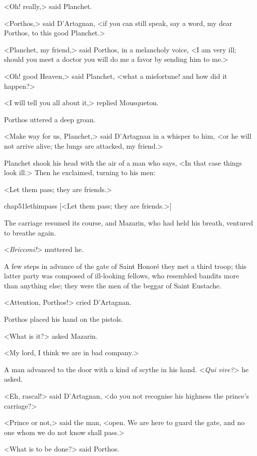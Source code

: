 <Oh! really,> said Planchet.

<Porthos,> said D'Artagnan, <if you can still speak, say a word, my dear Porthos, to this good Planchet.>

<Planchet, my friend,> said Porthos, in a melancholy voice, <I am very ill; should you meet a doctor you will do me a favor by sending him to me.>

<Oh! good Heaven,> said Planchet, <what a misfortune! and how did it happen?>

<I will tell you all about it,> replied Mousqueton.

Porthos uttered a deep groan.

<Make way for us, Planchet,> said D'Artagnan in a whisper to him, <or he will not arrive alive; the lungs are attacked, my friend.>

Planchet shook his head with the air of a man who says, <In that case things look ill.> Then he exclaimed, turning to his men:

<Let them pass; they are friends.>

\begin{bwbigpic}
	[\basicscale] 
	{chap51lethimpass}
	[<Let them pass; they are friends.>]
\end{bwbigpic}

The carriage resumed its course, and Mazarin, who had held his breath, ventured to breathe again.

<\textit{Bricconi!}> muttered he.

A few steps in advance of the gate of Saint Honoré they met a third troop; this latter party was composed of ill-looking fellows, who resembled bandits more than anything else; they were the men of the beggar of Saint Eustache.

<Attention, Porthos!> cried D'Artagnan.

Porthos placed his hand on the pistols.

<What is it?> asked Mazarin.

<My lord, I think we are in bad company.>

A man advanced to the door with a kind of scythe in his hand. <\textit{Qui vive?}> he asked.

<Eh, rascal!> said D'Artagnan, <do you not recognise his highness the prince's carriage?>

<Prince or not,> said the man, <open. We are here to guard the gate, and no one whom we do not know shall pass.>

<What is to be done?> said Porthos.

